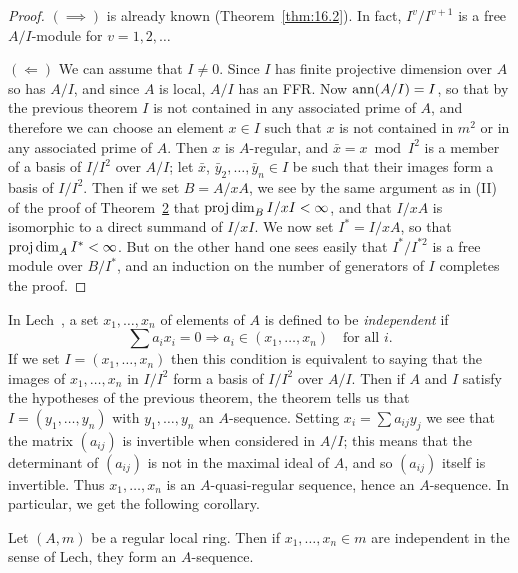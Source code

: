 \begin{proof}
$(\implies)$ is already known (Theorem~\ref{thm:16.2}). In fact, $I^v/I^{v+1}$ is a free
$A/I$-module for $v = 1, 2, \ldots$

$(\Longleftarrow)$ We can assume that $I \neq 0$. Since $I$ has finite projective dimension
over $A$ so has $A/I$, and since $A$ is local, $A/I$ has an FFR. Now $\operatorname{ann}(A/I) = I$,
so that by the previous theorem $I$ is not contained in any associated prime
of $A$, and therefore we can choose an element $x \in I$ such that $x$ is not
contained in $m^2$ or in any associated prime of $A$. Then $x$ is $A$-regular,
and $\bar{x} = x \bmod I^2$ is a member of a basis of $I/I^2$ over $A/I$; let $\bar{x}$,
$\bar{y}_2, \ldots, \bar{y}_n \in I$ be such that their images form a basis of $I/I^2$. Then if we
set $B = A/xA$, we see by the same argument as in (II) of the proof of
Theorem~\hyperref[thm:19.2]{2} that $\operatorname{proj\,dim}_B I/xI < \infty$, and that $I/xA$ is isomorphic to a direct
summand of $I/xI$. We now set $I^* = I/xA$, so that $\operatorname{proj\,dim}_A I^* < \infty$. But
on the other hand one sees easily that $I^*/I^{*2}$ is a free module over $B/I^*$,
and an induction on the number of generators of $I$ completes the proof.
\end{proof}

\begin{remark}
In Lech~\cite{Le1}, a set $x_1, \ldots, x_n$ of elements of $A$ is defined to be
\emph{independent} if
\[
  \sum a_ix_i = 0 \Rightarrow a_i \in (x_1, \ldots, x_n) \quad \text{for all } i.
\]
If we set $I = (x_1, \ldots, x_n)$ then this condition is equivalent to saying that
the images of $x_1, \ldots, x_n$ in $I/I^2$ form a basis of $I/I^2$ over $A/I$. Then if $A$
and $I$ satisfy the hypotheses of the previous theorem, the theorem tells us
that $I = (y_1, \ldots, y_n)$ with $y_1, \ldots, y_n$ an $A$-sequence. Setting $x_i = \sum a_{ij}y_j$ we
see that the matrix $(a_{ij})$ is invertible when considered in $A/I$; this means that
the determinant of $(a_{ij})$ is not in the maximal ideal of $A$, and so $(a_{ij})$ itself
is invertible. Thus $x_1, \ldots, x_n$ is an $A$-quasi-regular sequence, hence an
$A$-sequence. In particular, we get the following corollary.
\end{remark}

\begin{corollary*}
Let $(A, m)$ be a regular local ring. Then if $x_1, \ldots, x_n \in m$ are
independent in the sense of Lech, they form an $A$-sequence.
\end{corollary*}

